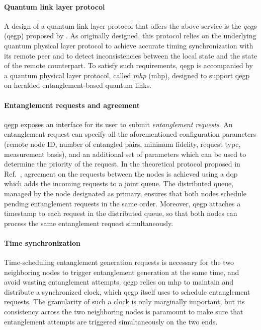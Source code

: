 \paragraph{Quantum link layer protocol}

A design of a quantum link layer protocol that offers the above service is the \emph{\acrlong{qegp}}
(\acrshort{qegp}) proposed by \textcite{dahlberg_2019_egp}. As originally designed, this protocol
relies on the underlying quantum physical layer protocol to achieve accurate timing synchronization
with its remote peer and to detect inconsistencies between the local state and the state of the
remote counterpart. To satisfy such requirements, \acrshort{qegp} is accompanied by a quantum
physical layer protocol, called \emph{\acrlong{mhp}} (\acrshort{mhp}), designed to support
\acrshort{qegp} on heralded entanglement-based quantum links.

\paragraph{Entanglement requests and agreement}

\acrshort{qegp} exposes an interface for its user to submit \emph{entanglement requests}. An
entanglement request can specify all the aforementioned configuration parameters (remote node ID,
number of entangled pairs, minimum fidelity, request type, measurement basis), and an additional set
of parameters which can be used to determine the priority of the request. In the theoretical
protocol proposed in Ref.~\cite{dahlberg_2019_egp}, agreement on the requests between the nodes is
achieved using a \acrfull{dqp} which adds the incoming requests to a joint queue. The distributed
queue, managed by the node designated as primary, ensures that both nodes schedule pending
entanglement requests in the same order. Moreover, \acrshort{qegp} attaches a timestamp to each
request in the distributed queue, so that both nodes can process the same entanglement request
simultaneously.

\paragraph{Time synchronization}

Time-scheduling entanglement generation requests is necessary for the two neighboring nodes to
trigger entanglement generation at the same time, and avoid wasting entanglement attempts.
\acrshort{qegp} relies on \acrshort{mhp} to maintain and distribute a synchronized clock, which
\acrshort{qegp} itself uses to schedule entanglement requests. The granularity of such a clock is
only marginally important, but its consistency across the two neighboring nodes is paramount to make
sure that entanglement attempts are triggered simultaneously on the two ends.

